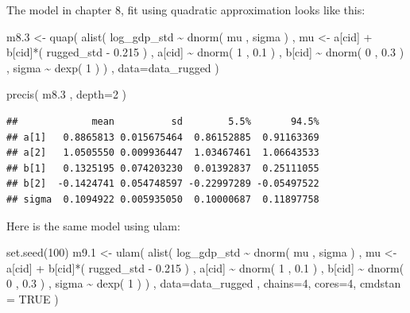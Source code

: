 \documentclass[
]{book}
\newenvironment{Shaded}{\begin{snugshade}}{\end{snugshade}}
\newcommand{\AttributeTok}[1]{\textcolor[rgb]{0.77,0.63,0.00}{#1}}
\newcommand{\ConstantTok}[1]{\textcolor[rgb]{0.00,0.00,0.00}{#1}}
\newcommand{\DecValTok}[1]{\textcolor[rgb]{0.00,0.00,0.81}{#1}}
\newcommand{\FloatTok}[1]{\textcolor[rgb]{0.00,0.00,0.81}{#1}}
\newcommand{\FunctionTok}[1]{\textcolor[rgb]{0.00,0.00,0.00}{#1}}
\newcommand{\NormalTok}[1]{#1}
\newcommand{\OtherTok}[1]{\textcolor[rgb]{0.56,0.35,0.01}{#1}}
\newcommand{\SpecialCharTok}[1]{\textcolor[rgb]{0.00,0.00,0.00}{#1}}
\begin{document}
The model in chapter 8, fit using quadratic approximation looks like this:

\begin{Shaded}
\begin{Highlighting}[]
\NormalTok{m8}\FloatTok{.3} \OtherTok{\textless{}{-}} \FunctionTok{quap}\NormalTok{( }\FunctionTok{alist}\NormalTok{(}
\NormalTok{log\_gdp\_std }\SpecialCharTok{\textasciitilde{}} \FunctionTok{dnorm}\NormalTok{( mu , sigma ) , }
\NormalTok{mu }\OtherTok{\textless{}{-}}\NormalTok{ a[cid] }\SpecialCharTok{+}\NormalTok{ b[cid]}\SpecialCharTok{*}\NormalTok{( rugged\_std }\SpecialCharTok{{-}} \FloatTok{0.215}\NormalTok{ ) , }
\NormalTok{a[cid] }\SpecialCharTok{\textasciitilde{}} \FunctionTok{dnorm}\NormalTok{( }\DecValTok{1}\NormalTok{ , }\FloatTok{0.1}\NormalTok{ ) , }
\NormalTok{b[cid] }\SpecialCharTok{\textasciitilde{}} \FunctionTok{dnorm}\NormalTok{( }\DecValTok{0}\NormalTok{ , }\FloatTok{0.3}\NormalTok{ ) , }
\NormalTok{sigma }\SpecialCharTok{\textasciitilde{}} \FunctionTok{dexp}\NormalTok{( }\DecValTok{1}\NormalTok{ )}
\NormalTok{) , }\AttributeTok{data=}\NormalTok{data\_rugged )}

\FunctionTok{precis}\NormalTok{( m8}\FloatTok{.3}\NormalTok{ , }\AttributeTok{depth=}\DecValTok{2}\NormalTok{ )}
\end{Highlighting}
\end{Shaded}

\begin{verbatim}
##             mean          sd        5.5%       94.5%
## a[1]   0.8865813 0.015675464  0.86152885  0.91163369
## a[2]   1.0505550 0.009936447  1.03467461  1.06643533
## b[1]   0.1325195 0.074203230  0.01392837  0.25111055
## b[2]  -0.1424741 0.054748597 -0.22997289 -0.05497522
## sigma  0.1094922 0.005935050  0.10000687  0.11897758
\end{verbatim}

Here is the same model using ulam:

\begin{Shaded}
\begin{Highlighting}[]
\FunctionTok{set.seed}\NormalTok{(}\DecValTok{100}\NormalTok{)}
\NormalTok{m9}\FloatTok{.1} \OtherTok{\textless{}{-}} \FunctionTok{ulam}\NormalTok{( }\FunctionTok{alist}\NormalTok{(}
\NormalTok{log\_gdp\_std }\SpecialCharTok{\textasciitilde{}} \FunctionTok{dnorm}\NormalTok{( mu , sigma ) ,}
\NormalTok{mu }\OtherTok{\textless{}{-}}\NormalTok{ a[cid] }\SpecialCharTok{+}\NormalTok{ b[cid]}\SpecialCharTok{*}\NormalTok{( rugged\_std }\SpecialCharTok{{-}} \FloatTok{0.215}\NormalTok{ ) ,}
\NormalTok{a[cid] }\SpecialCharTok{\textasciitilde{}} \FunctionTok{dnorm}\NormalTok{( }\DecValTok{1}\NormalTok{ , }\FloatTok{0.1}\NormalTok{ ) ,}
\NormalTok{b[cid] }\SpecialCharTok{\textasciitilde{}} \FunctionTok{dnorm}\NormalTok{( }\DecValTok{0}\NormalTok{ , }\FloatTok{0.3}\NormalTok{ ) ,}
\NormalTok{sigma }\SpecialCharTok{\textasciitilde{}} \FunctionTok{dexp}\NormalTok{( }\DecValTok{1}\NormalTok{ )}
\NormalTok{) , }\AttributeTok{data=}\NormalTok{data\_rugged , }\AttributeTok{chains=}\DecValTok{4}\NormalTok{, }\AttributeTok{cores=}\DecValTok{4}\NormalTok{, }\AttributeTok{cmdstan =} \ConstantTok{TRUE}\NormalTok{ )}
\end{Highlighting}
\end{Shaded}
\end{document}

